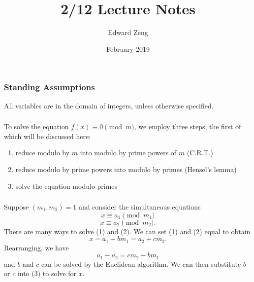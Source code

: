 \documentclass{article}
\title{2/12 Lecture Notes}
\author{Edward Zeng}
\date{February 2019}
\begin{document}
\maketitle

\subsubsection{Standing Assumptions}
All variables are in the domain of integers, unless otherwise specified.

\subsubsection{}
To solve the equation $f(x) \equiv 0 \pmod{m}$, we employ three steps, the first of which will be discussed here:
\begin{enumerate}
    \item reduce modulo by $m$ into modulo by prime powers of $m$ (C.R.T.)
    \item reduce modulo by prime powers into modulo by primes (Hensel's lemma)
    \item solve the equation modulo primes
\end{enumerate}

\subsubsection{}
Suppose $(m_{1},m_{2}) = 1$ and consider the simultaneous equations
\begin{equation}
    x \equiv a_{1} \pmod{m_{1}}
\end{equation}
\begin{equation}
    x \equiv a_{2} \pmod{m_{2}}.
\end{equation}
There are many ways to solve (1) and (2). We can set (1) and (2) equal to obtain
\begin{equation}
    x = a_{1} + bm_{1} = a_{2} + cm_{2}.
\end{equation}
Rearranging, we have
\begin{equation}
    a_{1} - a_{2} = cm_{2} - bm_{1}
\end{equation}
and $b$ and $c$ can be solved by the Euclidean algorithm. We can then substitute $b$ or $c$ into (3) to solve for $x$.
\end{document}

